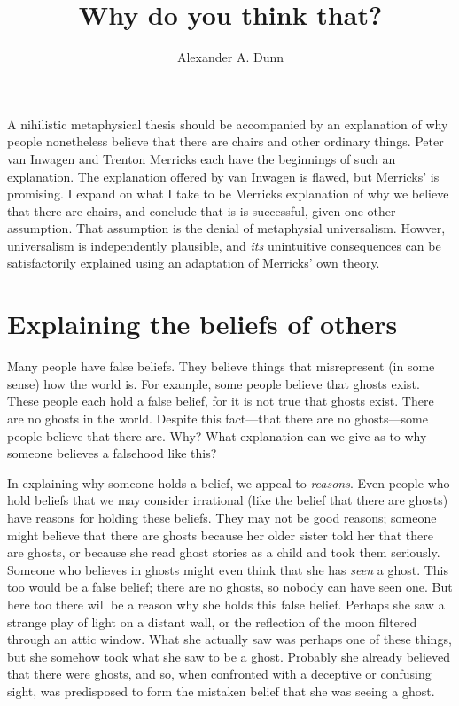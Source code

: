 \documentclass[11pt]{article}
\title{Why do you think that?}
\author{Alexander A. Dunn}
\begin{document}
\ifstandalone
\maketitle
\begin{spacing}{1.5}
\fi
\label{stroud}

A nihilistic metaphysical thesis should be accompanied by an
explanation of why people nonetheless believe that there are chairs
and other ordinary things.  Peter van Inwagen and Trenton Merricks
each have the beginnings of such an explanation.  The explanation
offered by van Inwagen is flawed, but Merricks' is promising.  I
expand on what I take to be Merricks explanation of why we believe
that there are chairs, and conclude that is is successful, given one
other assumption.  That assumption is the denial of metaphysial
universalism.  Howver, universalism is independently plausible, and
{\em its} unintuitive consequences can be satisfactorily explained
using an adaptation of Merricks' own theory.

\section{Explaining the beliefs of others}
\label{intro-beliefs}
\noindent Many people have false beliefs.  They believe things that
misrepresent (in some sense) how the world is.  For example, some
people believe that ghosts exist.  These people each hold a false
belief, for it is not true that ghosts exist.  There are no ghosts in
the world.  Despite this fact---that there are no ghosts---some people
believe that there are.  Why?  What explanation can we give as to why
someone believes a falsehood like this?

In explaining why someone holds a belief, we appeal to {\em reasons}.
Even people who hold beliefs that we may consider irrational (like the
belief that there are ghosts) have reasons for holding these beliefs.
They may not be good reasons; someone might believe that there are
ghosts because her older sister told her that there are ghosts, or
because she read ghost stories as a child and took them seriously.
Someone who believes in ghosts might even think that she has {\em
  seen} a ghost.  This too would be a false belief; there are no
ghosts, so nobody can have seen one.  But here too there will be a
reason why she holds this false belief.  Perhaps she saw a strange
play of light on a distant wall, or the reflection of the moon
filtered through an attic window.  What she actually saw was perhaps
one of these things, but she somehow took what she saw to be a ghost.
Probably she already believed that there were ghosts, and so, when
confronted with a deceptive or confusing sight, was predisposed to
form the mistaken belief that she was seeing a ghost.


\end{spacing}
\end{document}
